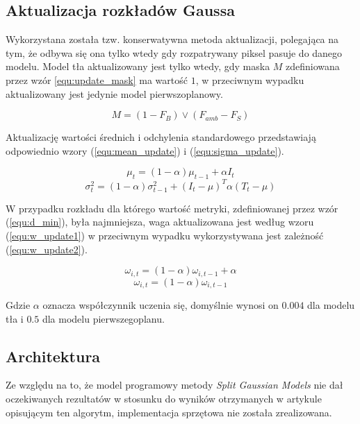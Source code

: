 \documentclass[10pt,a4paper]{article}
\begin{document}
\subsection{Aktualizacja rozkładów Gaussa}

Wykorzystana została tzw. konserwatywna metoda aktualizacji, polegająca na tym, że odbywa się ona tylko wtedy gdy rozpatrywany piksel pasuje do danego modelu. Model tła aktualizowany jest tylko wtedy, gdy maska $M$ zdefiniowana przez wzór \ref{equ:update_mask} ma wartość $1$, w przeciwnym wypadku aktualizowany jest jedynie model pierwszoplanowy.

\begin{equation}
M = (1-F_B) \lor (F_{amb} - F_S)
\label{equ:update_mask}
\end{equation}

\noindent Aktualizację wartości średnich i odchylenia standardowego przedstawiają odpowiednio wzory (\ref{equ:mean_update}) i (\ref{equ:sigma_update}).

\begin{equation}
\mu_t = (1-\alpha)\mu_{t-1} + \alpha I_t
\label{equ:mean_update}
\end{equation}
\begin{equation}
\sigma_t^2 = (1-\alpha) \sigma_{t-1}^2 + (I_t-\mu)^T \alpha (T_t - \mu)
\label{equ:sigma_update}
\end{equation}

\noindent W przypadku rozkładu dla którego wartość metryki, zdefiniowanej przez wzór (\ref{equ:d_min}), była najmniejsza, waga aktualizowana jest według wzoru (\ref{equ:w_update1}) w przeciwnym wypadku wykorzystywana jest zależność (\ref{equ:w_update2}).

\begin{equation}
\omega_{i,t} = (1-\alpha) \omega_{i,t-1} + \alpha
\label{equ:w_update1}
\end{equation}
\begin{equation}
\omega_{i,t} = (1-\alpha) \omega_{i,t-1}
\label{equ:w_update2}
\end{equation}

\noindent Gdzie $\alpha$ oznacza współczynnik uczenia się, domyślnie wynosi on $0.004$ dla modelu tła i $0.5$ dla modelu pierwszegoplanu.


\subsection{Architektura}

Ze względu na to, że model programowy metody \textit{Split Gaussian Models} nie dał oczekiwanych rezultatów w stosunku do wyników otrzymanych w artykule opisującym ten algorytm, implementacja sprzętowa nie została zrealizowana.
\end{document}
